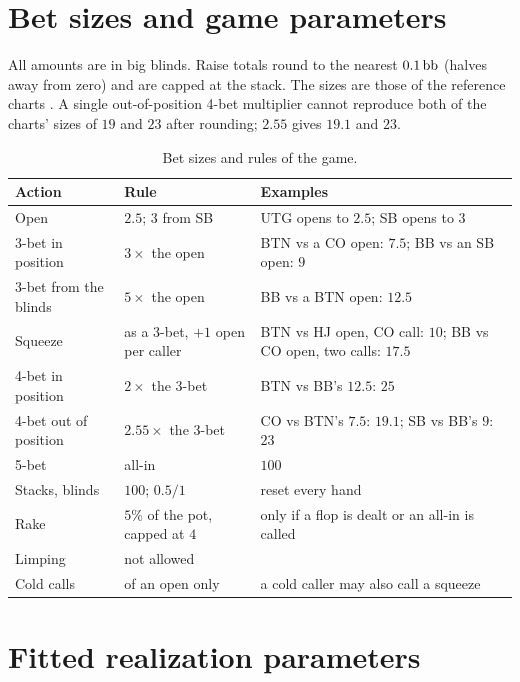\chapter{Bet sizes and game parameters}\label{app:game}

All amounts are in big blinds. Raise totals round to the nearest $0.1\,\mathrm{bb}$ (halves away from zero) and are capped at the stack. The sizes are those of the reference charts \cite{pokertrainer}. A single out-of-position 4-bet multiplier cannot reproduce both of the charts' sizes of $19$ and $23$ after rounding; $2.55$ gives $19.1$ and $23$.

\begin{table}[ht]
\centering\small
\begin{tabularx}{\linewidth}{@{}llX@{}}
\toprule
Action & Rule & Examples \\
\midrule
Open & $2.5$; $3$ from SB & UTG opens to $2.5$; SB opens to $3$ \\
3-bet in position & $3\times$ the open & BTN vs a CO open: $7.5$; BB vs an SB open: $9$ \\
3-bet from the blinds & $5\times$ the open & BB vs a BTN open: $12.5$ \\
Squeeze & as a 3-bet, $+1$ open per caller & BTN vs HJ open, CO call: $10$; BB vs CO open, two calls: $17.5$ \\
4-bet in position & $2\times$ the 3-bet & BTN vs BB's $12.5$: $25$ \\
4-bet out of position & $2.55\times$ the 3-bet & CO vs BTN's $7.5$: $19.1$; SB vs BB's $9$: $23$ \\
5-bet & all-in & $100$ \\
\midrule
Stacks, blinds & $100$; $0.5/1$ & reset every hand \\
Rake & $5\%$ of the pot, capped at $4$ & only if a flop is dealt or an all-in is called \\
Limping & not allowed & \\
Cold calls & of an open only & a cold caller may also call a squeeze \\
\bottomrule
\end{tabularx}
\caption{Bet sizes and rules of the game.}
\label{tab:betsizes}
\end{table}

\chapter{Fitted realization parameters}\label{app:params}

